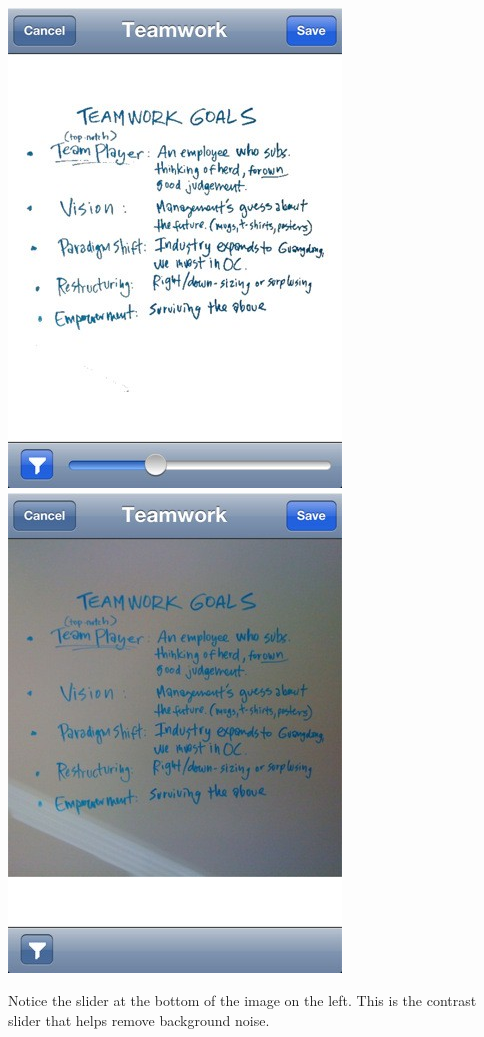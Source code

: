 \documentclass[]{article}
\begin{document}
			\includegraphics{images/team1.jpg}
			\includegraphics{images/team2.jpg}
			
			Notice the slider at the bottom of the image on the left. This is the contrast slider that helps remove background noise.
\end{document}

